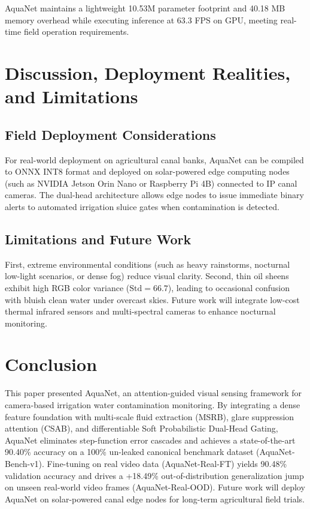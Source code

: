 \documentclass[journal]{IEEEtran}
\newcommand{\method}{AquaNet}
\newcommand{\datasetbench}{AquaNet-Bench-v1}
\newcommand{\datasetrealft}{AquaNet-Real-FT}
\newcommand{\datasetrealood}{AquaNet-Real-OOD}
\begin{document}
\method{} maintains a lightweight 10.53M parameter footprint and 40.18 MB memory overhead while executing inference at 63.3 FPS on GPU, meeting real-time field operation requirements.

\section{Discussion, Deployment Realities, and Limitations}
\label{sec:discussion}

\subsection{Field Deployment Considerations}
For real-world deployment on agricultural canal banks, \method{} can be compiled to ONNX INT8 format and deployed on solar-powered edge computing nodes (such as NVIDIA Jetson Orin Nano or Raspberry Pi 4B) connected to IP canal cameras. The dual-head architecture allows edge nodes to issue immediate binary alerts to automated irrigation sluice gates when contamination is detected.

\subsection{Limitations and Future Work}
First, extreme environmental conditions (such as heavy rainstorms, nocturnal low-light scenarios, or dense fog) reduce visual clarity. Second, thin oil sheens exhibit high RGB color variance ($\text{Std}=66.7$), leading to occasional confusion with bluish clean water under overcast skies. Future work will integrate low-cost thermal infrared sensors and multi-spectral cameras to enhance nocturnal monitoring.

\section{Conclusion}
\label{sec:conclusion}

This paper presented \method{}, an attention-guided visual sensing framework for camera-based irrigation water contamination monitoring. By integrating a dense feature foundation with multi-scale fluid extraction (MSRB), glare suppression attention (CSAB), and differentiable Soft Probabilistic Dual-Head Gating, \method{} eliminates step-function error cascades and achieves a state-of-the-art 90.40\% accuracy on a 100\% un-leaked canonical benchmark dataset (\datasetbench{}). Fine-tuning on real video data (\datasetrealft{}) yields 90.48\% validation accuracy and drives a +18.49\% out-of-distribution generalization jump on unseen real-world video frames (\datasetrealood{}). Future work will deploy \method{} on solar-powered canal edge nodes for long-term agricultural field trials.
\end{document}
